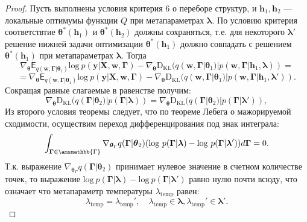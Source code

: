 \begin{proof}
Пусть выполнены условия критерия 6 о переборе структур, и $\mathbf{h}_1, \mathbf{h}_2$ --- локальные оптимумы функции $Q$ при метапараметрах $\boldsymbol{\lambda}$.
По условию критерия соответствтие $\boldsymbol{\theta}^{*}(\mathbf{h}_1)$ и $\boldsymbol{\theta}^{*}(\mathbf{h}_2)$ должны сохраняться, т.е. для некоторого $\boldsymbol{\lambda}'$ решение  нижней задачи оптимизации $\boldsymbol{\theta}^{*}(\mathbf{h}_1)$ должно совпадать с решением $\boldsymbol{\theta}^{*}(\mathbf{h}_1)$ при метапараметрах $\boldsymbol{\lambda}$. Тогда
\[
    \nabla_{\boldsymbol{\theta}} \mathsf{E}_{q(\mathbf{w}, \boldsymbol{\Gamma}|\boldsymbol{\theta}_1)} \text{log}~p(\mathbf{y}|\mathbf{X}, \mathbf{w}, \boldsymbol{\Gamma}) -\nabla_{\boldsymbol{\theta}}  \text{D}_{\text{KL}}(q(\mathbf{w}, \boldsymbol{\Gamma}|\boldsymbol{\theta}_1) | p(\mathbf{w}, \boldsymbol{\Gamma}|\mathbf{h}_1, \boldsymbol{\lambda})) = 
\]
\[
= \nabla_{\boldsymbol{\theta}} \mathsf{E}_{q(\mathbf{w}, \boldsymbol{\Gamma}|\boldsymbol{\theta}_1)} \text{log}~p(\mathbf{y}|\mathbf{X}, \mathbf{w}, \boldsymbol{\Gamma}) - \nabla_{\boldsymbol{\theta}}  \text{D}_{\text{KL}}(q(\mathbf{w}, \boldsymbol{\Gamma}|\boldsymbol{\theta}_1) | p(\mathbf{w}, \boldsymbol{\Gamma}|\mathbf{h}_1, \boldsymbol{\lambda}')).
\]
Сокращая равные слагаемые в равенстве получим:
\[
\nabla_{\boldsymbol{\theta}}  \text{D}_{\text{KL}}(q(\boldsymbol{\Gamma}|\boldsymbol{\theta}_2) | p(\boldsymbol{\Gamma}| \boldsymbol{\lambda})) = \nabla_{\boldsymbol{\theta}} \text{D}_{\text{KL}}(q(\boldsymbol{\Gamma}|\boldsymbol{\theta}_2) | p(\boldsymbol{\Gamma}| \boldsymbol{\lambda}')),
\] 
Из второго условия теоремы следует, что по теореме Лебега о мажорируемой сходимости, осуществим переход дифференцирования под знак интеграла:
\[
\int_{\boldsymbol{\Gamma} \in \amsmathbb{\Gamma}} \nabla_{\boldsymbol{\theta}_\Gamma} q(\boldsymbol{\Gamma}|\boldsymbol{\theta}_2) (\text{log}~p(\boldsymbol{\Gamma}| \boldsymbol{\lambda}) - \text{log}~p(\boldsymbol{\Gamma}| \boldsymbol{\lambda}')) d\boldsymbol{\Gamma} = 0.
\]
Т.к. выражение $ \nabla_{\boldsymbol{\theta}_\Gamma} q(\boldsymbol{\Gamma}|\boldsymbol{\theta}_2)$ принимает нулевое значение в счетном количестве точек, то выражение $\text{log}~p(\boldsymbol{\Gamma}| \boldsymbol{\lambda}) - \text{log}~p(\boldsymbol{\Gamma}| \boldsymbol{\lambda}')$ равно нулю почти всюду, что означает что метапараметр температуры $\lambda_\text{temp}$  равен:
\[
\lambda_\text{temp} = \lambda_\text{temp}',\quad \lambda_\text{temp} \in \boldsymbol{\lambda}, \lambda_\text{temp}' \in \boldsymbol{\lambda}'.
\]
\end{proof}
